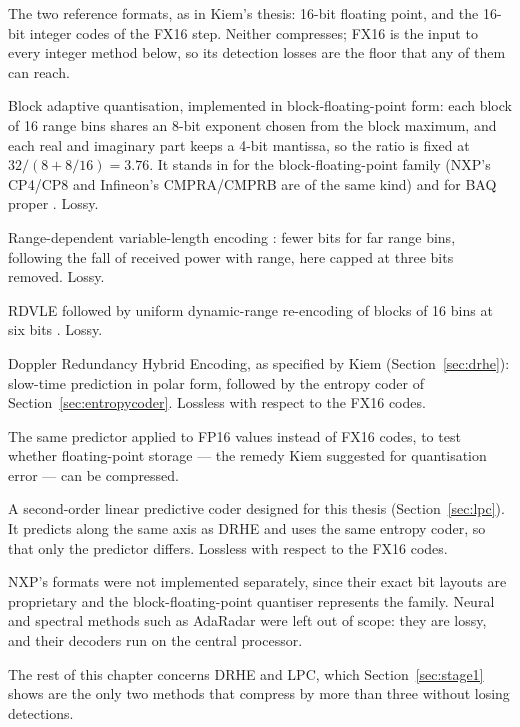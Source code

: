 \begin{description}[leftmargin=!,labelwidth=26mm,style=nextline,font=\normalfont\bfseries]
\item[FP16, FX16] The two reference formats, as in Kiem's thesis: 16-bit
floating point, and the 16-bit integer codes of the FX16 step. Neither
compresses; FX16 is the input to every integer method below, so its detection
losses are the floor that any of them can reach.
\item[BAQ] Block adaptive quantisation, implemented in block-floating-point
form: each block of 16 range bins shares an 8-bit exponent chosen from the
block maximum, and each real and imaginary part keeps a 4-bit mantissa, so the
ratio is fixed at $32/(8 + 8/16) = 3.76$. It stands in for the
block-floating-point family (NXP's CP4/CP8 and Infineon's CMPRA/CMPRB are of
the same kind) and for BAQ proper \cite{kwok1989}. Lossy.
\item[RDVLE] Range-dependent variable-length encoding \cite{li2014}: fewer
bits for far range bins, following the fall of received power with range, here
capped at three bits removed. Lossy.
\item[RDVLE+UDRE] RDVLE followed by uniform dynamic-range re-encoding of
blocks of 16 bins at six bits \cite{li2014}. Lossy.
\item[DRHE] Doppler Redundancy Hybrid Encoding, as specified by Kiem
(Section~\ref{sec:drhe}): slow-time prediction in polar form, followed by the
entropy coder of Section~\ref{sec:entropycoder}. Lossless with respect to the
FX16 codes.
\item[DRHE fp16] The same predictor applied to FP16 values instead of FX16
codes, to test whether floating-point storage --- the remedy Kiem suggested for
quantisation error --- can be compressed.
\item[LPC] A second-order linear predictive coder designed for this thesis
(Section~\ref{sec:lpc}). It predicts along the same axis as DRHE and uses the
same entropy coder, so that only the predictor differs. Lossless with respect
to the FX16 codes.
\end{description}

\noindent
NXP's formats were not implemented separately, since their exact bit layouts
are proprietary and the block-floating-point quantiser represents the family.
Neural and spectral methods such as AdaRadar \cite{park2026} were left out of
scope: they are lossy, and their decoders run on the central processor.

The rest of this chapter concerns DRHE and LPC, which Section~\ref{sec:stage1}
shows are the only two methods that compress by more than three without losing
detections.

